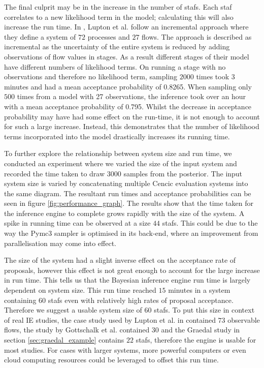 \documentclass[ %
                    author={Tom Jager},
                supervisor={Dr. Daniel Schien},
                    degree={MEng},
                     title={A Bayesian Inference Engine for Calibrating Uncertainty over UMIS Structured MFA Systems},
                  subtitle={},
                      type={research},
                      year={2019} ]{dissertation}
\begin{document}
The final culprit may be in the increase in the number of stafs. Each staf correlates to a new likelihood term in the model; calculating this will also increase the run time. In \cite{lupton2018incremental}, Lupton et al. follow an incremental approach where they define a system of $72$ processes and $27$ flows. The approach is described as incremental as the uncertainty of the entire system is reduced by adding observations of flow values in stages. As a result different stages of their model have different numbers of likelihood terms. On running a stage with no observations and therefore no likelihood term, sampling $2000$ times took 3 minutes and had a mean acceptance probability of 0.8265. When sampling only $500$ times from a model with 27 observations, the inference took over an hour with a mean acceptance probability of 0.795. Whilst the decrease in acceptance probability may have had some effect on the run-time, it is not enough to account for such a large increase. Instead, this demonstrates that the number of likelihood terms incorporated into the model drastically increases its running time.

To further explore the relationship between system size and run time, we conducted an experiment where we varied the size of the input system and recorded the time taken to draw $3000$ samples from the posterior. The input system size is varied by concatenating multiple Cencic evaluation systems into the same diagram. The resultant run times and acceptance probabilities can be seen in figure \ref{fig:performance_graph}. The results show that the time taken for the inference engine to complete grows rapidly with the size of the system. A spike in running time can be observed at a size $44$ stafs. This could be due to the way the Pymc3 sampler is optimised in its back-end, where an improvement from parallelisation may come into effect.

The size of the system had a slight inverse effect on the acceptance rate of proposals, however this effect is not great enough to account for the large increase in run time. This tells us that the Bayesian inference engine run time is largely dependent on system size. This run time reached $15$ minutes in a system containing $60$ stafs even with relatively high rates of proposal acceptance. Therefore we suggest a usable system size of $60$ stafs. To put this size in context of real IE studies, the case study used by Lupton et al. in \cite{lupton2018incremental} contained $73$ observable flows, the study by Gottschalk et al. \cite{gottschalk2010probabilistic} contained $30$ and the Graedal study in section \ref{sec:graedal_example} contains $22$ stafs, therefore the engine is usable for most studies. For cases with larger systems, more powerful computers or even cloud computing resources could be leveraged to offset this run time.
\end{document}
